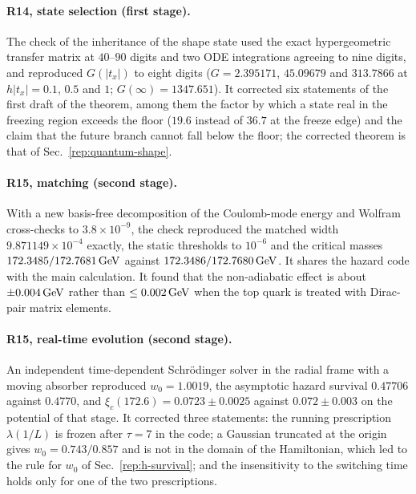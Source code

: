 \paragraph{R14, state selection (first stage).}
The check of the inheritance of the shape state used the exact hypergeometric transfer matrix at $40$--$90$ digits and two ODE integrations agreeing to nine digits, and reproduced $G(|t_x|)$ to eight digits ($G=2.395171$, $45.09679$ and $313.7866$ at $h|t_x|=0.1$, $0.5$ and $1$; $G(\infty)=1347.651$). %
It corrected six statements of the first draft of the theorem, among them the factor by which a state real in the freezing region exceeds the floor ($19.6$ instead of $36.7$ at the freeze edge) and the claim that the future branch cannot fall below the floor; the corrected theorem is that of Sec.~\ref{rep:quantum-shape}. %

\paragraph{R15, matching (second stage).}
With a new basis-free decomposition of the Coulomb-mode energy and Wolfram cross-checks to $3.8\times10^{-9}$, the check reproduced the matched width $9.871149\times10^{-4}$ exactly, the static thresholds to $10^{-6}$ and the critical masses $172.3485/\allowbreak 172.7681\,\mathrm{GeV}$ against $172.3486/\allowbreak 172.7680\,\mathrm{GeV}$. %
It shares the hazard code with the main calculation.
It found that the non-adiabatic effect is about $\pm0.004\,\mathrm{GeV}$ rather than $\le0.002\,\mathrm{GeV}$ when the top quark is treated with Dirac-pair matrix elements.

\paragraph{R15, real-time evolution (second stage).}
An independent time-dependent Schr\"odinger solver in the radial frame with a moving absorber reproduced $w_0=1.0019$, the asymptotic hazard survival $0.47706$ against $0.4770$, and $\xi_c(172.6)=0.0723\pm0.0025$ against $0.072\pm0.003$ on the potential of that stage. %
It corrected three statements: the running prescription $\lambda(1/L)$ is frozen after $\tau=7$ in the code; a Gaussian truncated at the origin gives $w_0=0.743/\allowbreak 0.857$ and is not in the domain of the Hamiltonian, which led to the rule for $w_0$ of Sec.~\ref{rep:h-survival}; and the insensitivity to the switching time holds only for one of the two prescriptions.

